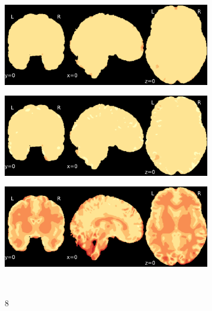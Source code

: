 \documentclass{article}
\begin{document}
\begin{landscape}
\begin{figure}
\begin{subfigure}[t]{0.2\paperheight}
        \end{subfigure}
        \begin{subfigure}[t]{0.2\paperheight}
            \centering
            \includegraphics[width=\textwidth]{figures/sig/fwhm_5/rr_ds002338_sub-xp201_sig.pdf}
        \end{subfigure}
        \begin{subfigure}[t]{0.2\paperheight}
            \centering
            \includegraphics[width=\textwidth]{figures/sig/fwhm_5/rs_ds002338_sub-xp201_sig.pdf}
        \end{subfigure}
        \begin{subfigure}[t]{0.2\paperheight}
            \centering
            \includegraphics[width=\textwidth]{figures/sig/fwhm_5/rr.rs_ds002338_sub-xp201_sig.pdf}
        \end{subfigure} \\
        \begin{subfigure}[b][][c]{0.01\paperwidth} 8 \vspace*{15pt} \end{subfigure}

\end{figure}
\end{landscape}
\end{document}
